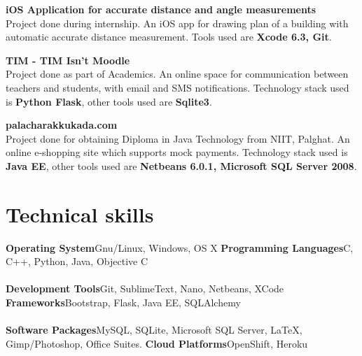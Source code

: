 \documentclass[11pt,a4paper,sans]{moderncv} %
\begin{document}
\cvlistitem
{\textbf{iOS Application for accurate distance and angle measurements}
  \\Project done during internship. An iOS app for drawing plan of a building with automatic accurate distance measurement. Tools used are \textbf{Xcode 6.3, Git}. \\}

\cvlistitem
{\textbf{TIM - TIM Isn't Moodle}
  \\Project done as part of Academics. An online space for communication between teachers and students, with email and SMS notifications. Technology stack used is \textbf{Python Flask}, other tools used are \textbf{Sqlite3}. \\}
  
\cvlistitem
{\textbf{palacharakkukada.com}
  \\Project done for obtaining Diploma in Java Technology from NIIT, Palghat. An online e-shopping site which supports mock payments. Technology stack used is \textbf{Java EE}, other tools used are \textbf{Netbeans 6.0.1, Microsoft SQL Server 2008}. \\}



\section{Technical skills}

\cvcomputer
{\textbf{Operating System}}{Gnu/Linux, Windows, OS X}
{\textbf{Programming Languages}}{C, C++, Python, Java, Objective C}
~\\
~\\
\cvcomputer
{\textbf{Development Tools}}{Git, SublimeText, Nano, Netbeans, XCode}
{\textbf{Frameworks}}{Bootstrap, Flask, Java EE, SQLAlchemy}
~\\
~\\
\cvcomputer
{\textbf{Software Packages}}{MySQL, SQLite, Microsoft SQL Server, \LaTeX, Gimp/Photoshop, Office Suites.}
{\textbf{Cloud Platforms}}{OpenShift, Heroku}
{}{}



\end{document}
